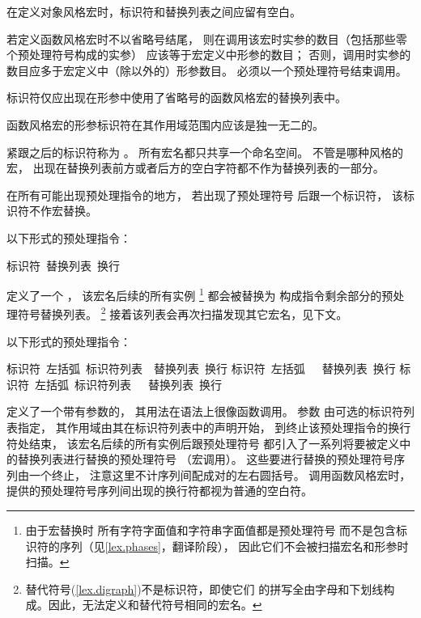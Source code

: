 \pnum
{}%
在定义对象风格宏时，标识符和替换列表之间应留有空白。

\pnum
若定义函数风格宏时不以省略号结尾，
则在调用该宏时实参的数目（包括那些零个预处理符号构成的实参）
应该等于宏定义中形参的数目；
否则，调用时实参的数目应多于宏定义中（除以外的）形参数目。
必须以一个预处理符号\tcode{)}结束调用。

\pnum
{}%
标识符仅应出现在形参中使用了省略号的函数风格宏的替换列表中。

\pnum
函数风格宏的形参标识符在其作用域范围内应该是独一无二的。

\pnum
紧跟之后的标识符称为
%
%
。
所有宏名都只共享一个命名空间。
不管是哪种风格的宏，
出现在替换列表前方或者后方的空白字符都不作为替换列表的一部分。

\pnum
在所有可能出现预处理指令的地方，
若出现了预处理符号
\tcode{\#}
后跟一个标识符，
该标识符不作宏替换。

\pnum
以下形式的预处理指令：

\begin{ncsimplebnf}
 标识符~替换列表~换行
%
\end{ncsimplebnf}

定义了一个
%
，
该宏名后续的所有实例
\footnote{由于宏替换时
	所有字符字面值和字符串字面值都是预处理符号
	而不是包含标识符的序列（见\ref{lex.phases}，翻译阶段），
	因此它们不会被扫描宏名和形参时扫描。}
都会被替换为
构成指令剩余部分的预处理符号替换列表。
\footnote{替代符号(\ref{lex.digraph})不是标识符，即使它们
	的拼写全由字母和下划线构成。因此，无法定义和替代符号相同的宏名。}
接着该列表会再次扫描发现其它宏名，见下文。

\pnum
以下形式的预处理指令：

\begin{ncsimplebnf}
 标识符~左括弧~标识符列表\opt{}~\terminal{)}~替换列表~换行\br
{} 标识符~左括弧~~\terminal{)}~替换列表~换行\br
{} 标识符~左括弧~标识符列表~~\terminal{)}~替换列表~换行\br
\end{ncsimplebnf}

%
定义了一个带有参数的，
其用法在语法上很像函数调用。
参数
%
由可选的标识符列表指定，
其作用域由其在标识符列表中的声明开始，
到终止该预处理指令的换行符处结束，
该宏名后续的所有实例后跟预处理符号\tcode{(}
都引入了一系列将要被定义中的替换列表进行替换的预处理符号
（宏调用）。
%
这些要进行替换的预处理符号序列由一个\tcode{)}终止，
注意这里不计序列间配成对的左右圆括号。
调用函数风格宏时，提供的预处理符号序列间出现的换行符都视为普通的空白符。

